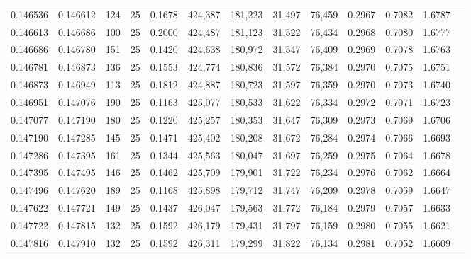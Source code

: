 \begin{tabular}{rrrrrrrrrrrrr}
0.146536 & 0.146612 &   124 &  25 &                                     0.1678 & 424,387 & 181,223 &  31,497 &  76,459 & 0.2967 & 0.7082 & 1.6787 \\
0.146613 & 0.146686 &   100 &  25 &                                     0.2000 & 424,487 & 181,123 &  31,522 &  76,434 & 0.2968 & 0.7080 & 1.6777 \\
0.146686 & 0.146780 &   151 &  25 &                                     0.1420 & 424,638 & 180,972 &  31,547 &  76,409 & 0.2969 & 0.7078 & 1.6763 \\
0.146781 & 0.146873 &   136 &  25 &                                     0.1553 & 424,774 & 180,836 &  31,572 &  76,384 & 0.2970 & 0.7075 & 1.6751 \\
0.146873 & 0.146949 &   113 &  25 &                                     0.1812 & 424,887 & 180,723 &  31,597 &  76,359 & 0.2970 & 0.7073 & 1.6740 \\
0.146951 & 0.147076 &   190 &  25 &                                     0.1163 & 425,077 & 180,533 &  31,622 &  76,334 & 0.2972 & 0.7071 & 1.6723 \\
0.147077 & 0.147190 &   180 &  25 &                                     0.1220 & 425,257 & 180,353 &  31,647 &  76,309 & 0.2973 & 0.7069 & 1.6706 \\
0.147190 & 0.147285 &   145 &  25 &                                     0.1471 & 425,402 & 180,208 &  31,672 &  76,284 & 0.2974 & 0.7066 & 1.6693 \\
0.147286 & 0.147395 &   161 &  25 &                                     0.1344 & 425,563 & 180,047 &  31,697 &  76,259 & 0.2975 & 0.7064 & 1.6678 \\
0.147395 & 0.147495 &   146 &  25 &                                     0.1462 & 425,709 & 179,901 &  31,722 &  76,234 & 0.2976 & 0.7062 & 1.6664 \\
0.147496 & 0.147620 &   189 &  25 &                                     0.1168 & 425,898 & 179,712 &  31,747 &  76,209 & 0.2978 & 0.7059 & 1.6647 \\
0.147622 & 0.147721 &   149 &  25 &                                     0.1437 & 426,047 & 179,563 &  31,772 &  76,184 & 0.2979 & 0.7057 & 1.6633 \\
0.147722 & 0.147815 &   132 &  25 &                                     0.1592 & 426,179 & 179,431 &  31,797 &  76,159 & 0.2980 & 0.7055 & 1.6621 \\
0.147816 & 0.147910 &   132 &  25 &                                     0.1592 & 426,311 & 179,299 &  31,822 &  76,134 & 0.2981 & 0.7052 & 1.6609 \\

\end{tabular}
